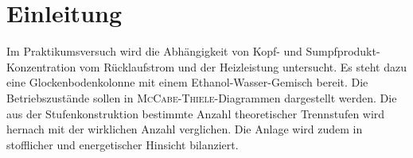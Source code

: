 %
\pagebreak
\section{Einleitung}
\label{sec:einleitung}
Im Praktikumsversuch wird die Abhängigkeit von Kopf- und Sumpfprodukt-Konzentration vom Rücklaufstrom und der Heizleistung untersucht. Es steht dazu eine Glockenbodenkolonne mit einem Ethanol-Wasser-Gemisch bereit. Die Betriebszustände sollen in \textsc{McCabe}-\textsc{Thiele}-Diagrammen dargestellt werden. Die aus der Stufenkonstruktion bestimmte Anzahl theoretischer Trennstufen wird hernach mit der wirklichen Anzahl verglichen. Die Anlage wird zudem in stofflicher und energetischer Hinsicht bilanziert.



